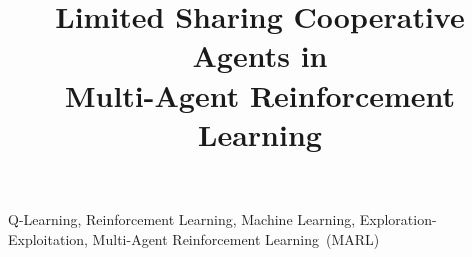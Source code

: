 \documentclass{article}
\title{Limited Sharing Cooperative Agents in \\ Multi-Agent Reinforcement Learning}
\newcommand{\MARL}{Multi-Agent Reinforcement Learning}
\begin{document}
%
\maketitle
%
\begin{abstract}

 
\end{abstract}
%
\begin{keywords}
Q-Learning, Reinforcement Learning, Machine Learning, Exploration-Exploitation, \MARL\ (MARL) 
\end{keywords}

%




 













\end{document}
